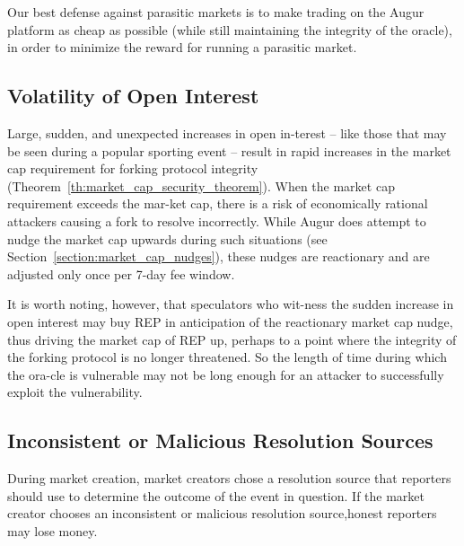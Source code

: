 \documentclass[12pt,floatfix,reprint,nofootinbib,amsmath,amssymb,epsfig,pre,floats,letterpaper,groupedaffiliation]{revtex4-1}
\theoremstyle{definition}
\theoremstyle{definition}
\begin{document}
Our best defense against parasitic markets is to make trading on the Augur platform as cheap as possible (while still maintaining the integrity of the oracle), in order to minimize the reward for running a parasitic market.

\subsection{Volatility of Open Interest}

Large, sudden, and unexpected increases in open in-\linebreak terest -- like those that may be seen during a popular sporting event -- result in rapid increases in the market cap requirement for forking protocol integrity (Theorem\linebreak ~\ref{th:market_cap_security_theorem}). When the market cap requirement exceeds the mar-\linebreak ket cap, there is a risk of economically rational attackers causing a fork to resolve incorrectly. While Augur does attempt to nudge the market cap upwards during such situations (see Section~\ref{section:market_cap_nudges}), these nudges are reactionary and are adjusted only once per 7-day fee window.

It is worth noting, however, that speculators who wit-\linebreak ness the sudden increase in open interest may buy REP in anticipation of the reactionary market cap nudge, thus driving the market cap of REP up, perhaps to a point where the integrity of the forking protocol is no longer threatened. So the length of time during which the ora-\linebreak cle is vulnerable may not be long enough for an attacker to successfully exploit the vulnerability.

\subsection{Inconsistent or Malicious Resolution Sources}

During market creation, market creators chose a resolution source that reporters should use to determine the outcome of the event in question. If the market creator chooses an inconsistent or malicious resolution source,\linebreak honest reporters may lose money.
\end{document}
